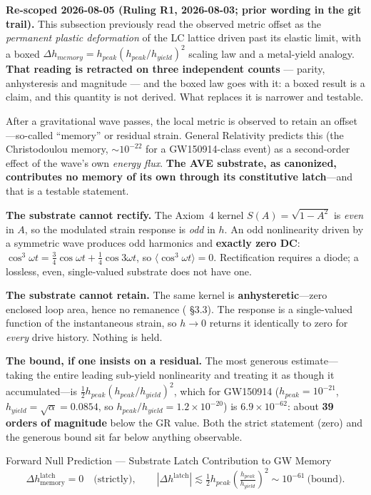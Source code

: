 \noindent\textbf{Re-scoped 2026-08-05 (Ruling R1, 2026-08-03; prior wording in the git trail).} This subsection previously read the observed metric offset as the \emph{permanent plastic deformation} of the LC lattice driven past its elastic limit, with a boxed $\Delta h_{memory} = h_{peak}(h_{peak}/h_{yield})^2$ scaling law and a metal-yield analogy. \textbf{That reading is retracted on three independent counts} --- parity, anhysteresis and magnitude --- and the boxed law goes with it: a boxed result is a claim, and this quantity is not derived. What replaces it is narrower and testable.

After a gravitational wave passes, the local metric is observed to retain an offset---so-called ``memory'' or residual strain. General Relativity predicts this (the Christodoulou memory, $\sim 10^{-22}$ for a GW150914-class event) as a second-order effect of the wave's own \emph{energy flux}. \textbf{The AVE substrate, as canonized, contributes no memory of its own through its constitutive latch}---and that is a testable statement.

\noindent\textbf{The substrate cannot rectify.} The Axiom~4 kernel $S(A) = \sqrt{1 - A^2}$ is \emph{even} in $A$, so the modulated strain response is \emph{odd} in $h$. An odd nonlinearity driven by a symmetric wave produces odd harmonics and \textbf{exactly zero DC}: $\cos^3\omega t = \tfrac34\cos\omega t + \tfrac14\cos 3\omega t$, so $\langle\cos^3\omega t\rangle = 0$. Rectification requires a diode; a lossless, even, single-valued substrate does not have one.

\noindent\textbf{The substrate cannot retain.} The same kernel is \textbf{anhysteretic}---zero enclosed loop area, hence no remanence ( \S3.3). The response is a single-valued function of the instantaneous strain, so $h \to 0$ returns it identically to zero for \emph{every} drive history. Nothing is held.

\noindent\textbf{The bound, if one insists on a residual.} The most generous estimate---taking the entire leading sub-yield nonlinearity and treating it as though it accumulated---is $\tfrac12 h_{peak}(h_{peak}/h_{yield})^2$, which for GW150914 ($h_{peak} = 10^{-21}$, $h_{yield} = \sqrt{\alpha} = 0.0854$, so $h_{peak}/h_{yield} = 1.2\times10^{-20}$) is $6.9\times10^{-62}$: about \textbf{39 orders of magnitude} below the GR value. Both the strict statement (zero) and the generous bound sit far below anything observable.

\begin{resultbox}{Forward Null Prediction --- Substrate Latch Contribution to GW Memory}
\begin{equation}
    \Delta h_{\text{memory}}^{\text{latch}} = 0
    \quad\text{(strictly)}, \qquad
    \left|\Delta h^{\text{latch}}\right| \lesssim
    \tfrac12 h_{peak}\!\left(\tfrac{h_{peak}}{h_{yield}}\right)^{2}
    \sim 10^{-61}\ \text{(bound)} .
\end{equation}
\end{resultbox}

